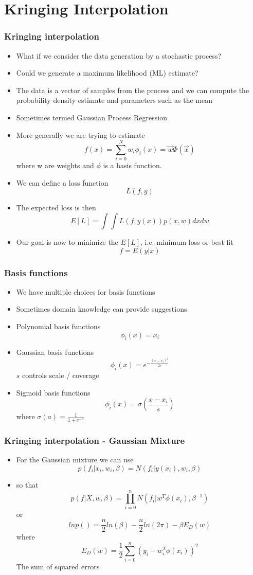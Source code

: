 \documentclass[10pt]{beamer}
\begin{document}
\section{Kringing Interpolation}

\begin{frame}
  \frametitle{Kringing interpolation}
  \begin{itemize}
  \item What if we consider the data generation by a stochastic process?
  \item Could we generate a maximum likelihood (ML) estimate?
  \item The data is a vector of samples from the process and we can
    compute the probability density estimate and parameters such as
    the mean
  \item Sometimes termed Gaussian Process Regression
  \item More generally we are trying to estimate
    \[
      f(x) = \sum_{i=0}^N w_i \phi_i(x) = \vec{w} \Phi(\vec{x})
    \]
    where w are weights and $\phi$ is a basis function.
    \pause
  \item We can define a loss function
    \[ L(f, y) \]
  \item The expected loss is then
    \[ E[L] = \int \int L( f, y(x) ) p(x,w) dx dw \]
  \item Our goal is now to minimize the $E[L]$, i.e. minimum loss or best fit
    \[ f = E(y|x) \]
  \end{itemize}
\end{frame}

\begin{frame}
  \frametitle{Basis functions}
  \begin{itemize}
  \item We have multiple choices for basis functions
  \item Sometimes domain knowledge can provide suggestions
  \item Polynomial basis functions
    \[ \phi_i(x) = x_i \]
  \item Gaussian basis functions
    \[
      \phi_i(x) = e^{-\frac{(x-x_i)^2}{2s}}
    \]
    $s$ controls scale / coverage
  \item Sigmoid basis functions
    \[
      \phi_i(x) = \sigma \left( \frac{ x-x_i }{s} \right)
    \] where
    $\sigma(a) = \frac{1}{1+e^{-a}}$
  \end{itemize}
\end{frame}

\begin{frame}
  \frametitle{Kringing interpolation - Gaussian Mixture}
  \begin{itemize}
  \item For the Gaussian mixture we can use
    \[ p(f_i | x_i, w_i, \beta) = N( f_i | y(x_i), w_i, \beta)  \]
  \item so that
    \[
      p( f | X, w, \beta) = \prod_{i=0}^n N(f_i | w^T \phi(x_i), \beta^{-1})
    \] or
    \[
      ln p() = \frac{n}{2} ln(\beta)  - \frac{n}{2} ln(2\pi) - \beta E_D(w)
    \] where
    \[ E_D(w) = \frac{1}{2} \sum_{i=0}^n (y_i - w^T_i \phi(x_i))^2 \] The sum of squared errors
  \end{itemize}
\end{frame}
\end{document}
